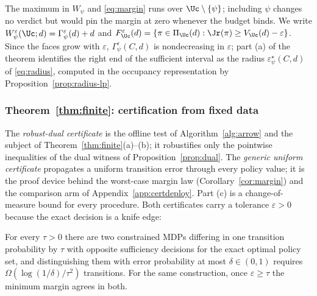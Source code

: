 The maximum in $W_\psi$ and \eqref{eq:margin} runs over $\Uc\setminus\{\psi\}$; including
$\psi$ changes no verdict but would pin the margin at zero whenever the budget binds. We
write $W^\varepsilon_\psi(\Uc;d)=\Gamma^\varepsilon_\psi(d)+d$ and
$F^\varepsilon_{\Uc}(d)=\{\pi\in\Pi_{\Uc}(d):\Jr(\pi)\ge V_{\Uc}(d)-\varepsilon\}$. Since the
faces grow with $\varepsilon$, $\Gamma^\varepsilon_\psi(C,d)$ is nondecreasing in
$\varepsilon$; part (a) of the theorem identifies the right end of the sufficient interval as
the radius $\varepsilon^\star_\psi(C,d)$ of \eqref{eq:radius}, computed in the occupancy
representation by Proposition~\ref{prop:radius-lp}.

\subsubsection*{Theorem~\ref{thm:finite}: certification from fixed data}
\label{app:proof-finite}\label{app:proof-knife}

The \emph{robust-dual certificate} is the offline test of Algorithm~\ref{alg:arrow} and the
subject of Theorem~\ref{thm:finite}(a)--(b); it robustifies only the pointwise inequalities of
the dual witness of Proposition~\ref{prop:dual}. The \emph{generic uniform certificate}
propagates a uniform transition error through every policy value; it is the proof device
behind the worst-case margin law (Corollary~\ref{cor:margin}) and the comparison arm of
Appendix~\ref{app:certdeploy}. Part (c) is a change-of-measure bound for every procedure.
Both certificates carry a tolerance $\varepsilon>0$ because the exact decision is a knife
edge:

\begin{proposition}
\label{prop:knife}
For every \(\tau>0\) there are two constrained MDPs differing in one transition
probability by \(\tau\) with opposite sufficiency decisions for the exact optimal
policy set, and distinguishing them with error probability at most
\(\delta\in(0,1)\) requires
\(\Omega\!\left(\log(1/\delta)/\tau^{2}\right)\) transitions. For the same
construction, once \(\varepsilon\geq\tau\) the minimum margin agrees in both.
\end{proposition}

